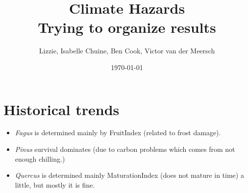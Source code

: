 \documentclass[11pt,letter]{article}
\begin{document}

\renewcommand{\refname}{\CHead{}}

\setlength{\parindent}{0cm}
\setlength{\parskip}{5pt}

\title{Climate Hazards \\ Trying to organize results}
\author{Lizzie, Isabelle Chuine, Ben Cook, Victor van der Meersch}
\date{\today}
\maketitle
\tableofcontents

\section{Historical trends}

\begin{itemize}
\item \emph{Fagus} is determined mainly by FruitIndex (related to frost damage). 
\item \emph{Pinus} survival dominates (due to carbon problems which comes from not enough chilling.) 
\item \emph{Quercus} is determined mainly MaturationIndex (does not mature in time) a little, but mostly it is fine. 
\end{itemize}
\end{document}
